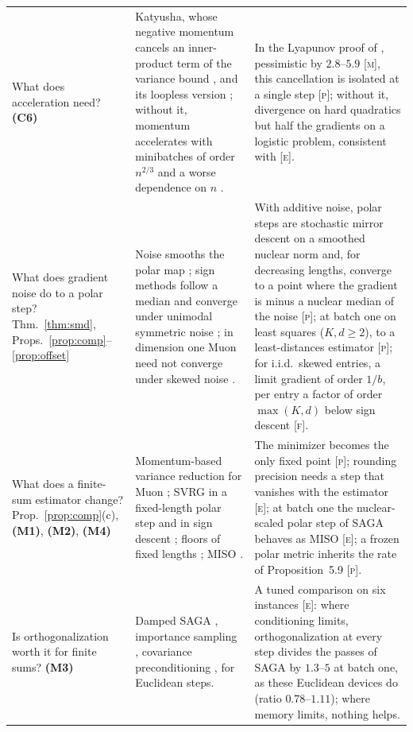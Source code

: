 \documentclass[10pt]{article}
\newcommand{\finding}[1]{\textbf{(#1)}}
\newcommand{\nat}[1]{\textsc{[#1]}}
\begin{document}
\begin{table}[t]
\begin{tabularx}{\textwidth}{@{}>{\raggedright\arraybackslash}p{}YY@{}}
What does acceleration need? \finding{C6} &
Katyusha, whose negative momentum cancels an inner-product term of the variance bound \cite{allenzhu2018katyusha},
and its loopless version \cite{kovalev2020dont}; without it, momentum accelerates with minibatches of order
$n^{2/3}$ and a worse dependence on $n$ \cite{driggs2022accelerating}. &
In the Lyapunov proof of \cite{kovalev2020dont}, pessimistic by $2.8$--$5.9$ \nat{m}, this cancellation is isolated
at a single step \nat{p}; without it, divergence on hard quadratics but half the gradients on a logistic problem,
consistent with \cite{allenzhu2018katyusha} \nat{e}. \\
What does gradient noise do to a polar step? Thm.~\ref{thm:smd}, Props.~\ref{prop:comp}--\ref{prop:offset} &
Noise smooths the polar map \cite{xie2026muon,chen2026when}; sign methods follow a median and converge under
unimodal symmetric noise \cite{chen2020distributed,bernstein2019majority}; in dimension one Muon need not converge
under skewed noise \cite{do2026muon}. &
With additive noise, polar steps are stochastic mirror descent on a smoothed nuclear norm and, for decreasing
lengths, converge to a point where the gradient is minus a nuclear median of the noise \nat{p}; at batch one on least
squares ($K,d\ge2$), to a least-distances estimator \nat{p}; for i.i.d.\ skewed entries, a limit gradient of order $1/b$,
per entry a factor of order $\max(K,d)$ below sign descent \nat{f}. \\
What does a finite-sum estimator change? Prop.~\ref{prop:comp}(c), \finding{M1}, \finding{M2}, \finding{M4} &
Momentum-based variance reduction for Muon \cite{liu2025marsm}; SVRG in a fixed-length polar step
\cite{li2026implicit} and in sign descent \cite{chzhen2023signsvrg}; floors of fixed lengths \cite{lau2025polargrad}; MISO \cite{mairal2015incremental}. &
The minimizer becomes the only fixed point \nat{p}; rounding precision needs a step that vanishes with the estimator
\nat{e}; at batch one the nuclear-scaled polar step of SAGA behaves as MISO \nat{e}; a frozen polar metric inherits
the rate of Proposition~5.9 \nat{p}. \\
Is orthogonalization worth it for finite sums? \finding{M3} &
Damped SAGA \cite{driggs2019biased}, importance sampling \cite{xiao2014proximal}, covariance preconditioning
\cite{yang2014data}, for Euclidean steps. &
A tuned comparison on six instances \nat{e}: where conditioning limits, orthogonalization at every step divides the
passes of SAGA by $1.3$--$5$ at batch one, as these Euclidean devices do (ratio $0.78$--$1.11$); where memory limits,
nothing helps. \\
\bottomrule
\end{tabularx}
\end{table}
\end{document}

